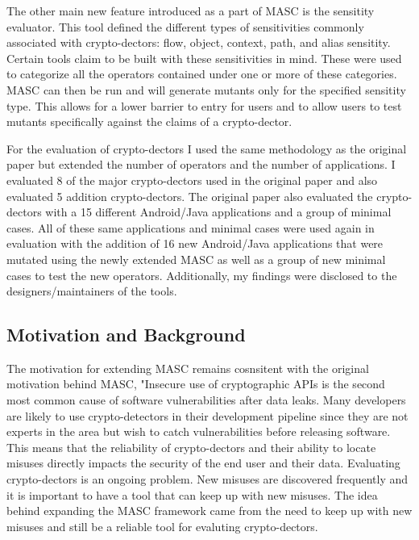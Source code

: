 The other main new feature introduced as a part of MASC is the sensitity evaluator. This tool defined the different types of sensitivities commonly associated with crypto-dectors: flow, object, context, path, and alias sensitity. Certain tools claim to be built with these sensitivities in mind. These were used to categorize all the operators contained under one or more of these categories. MASC can then be run and will generate mutants only for the specified sensitity type. This allows for a lower barrier to entry for users and to allow users to test mutants specifically against the claims of a crypto-dector. 

For the evaluation of crypto-dectors I used the same methodology as the original paper but extended the number of operators and the number of applications. I evaluated 8 of the major crypto-dectors used in the original paper and also evaluated 5 addition crypto-dectors. The original paper also evaluated the crypto-dectors with a 15 different Android/Java applications and a group of minimal cases. All of these same applications and minimal cases were used again in evaluation with the addition of 16 new Android/Java applications that were mutated using the newly extended MASC as well as a group of new minimal cases to test the new operators. Additionally, my findings were disclosed to the designers/maintainers of the tools. 


\subsection{Motivation and Background}
\label{ch1:subsec:motivation}

The motivation for extending MASC remains cosnsitent with the original motivation behind MASC, "Insecure use of cryptographic APIs is the second most common cause of software vulnerabilities after data leaks. Many developers are likely to use crypto-detectors in their development pipeline since they are not experts in the area but wish to catch vulnerabilities before releasing software. This means that the reliability of crypto-dectors and their ability to locate misuses directly impacts the security of the end user and their data. Evaluating crypto-dectors is an ongoing problem. New misuses are discovered frequently and it is important to have a tool that can keep up with new misuses. The idea behind expanding the MASC framework came from the need to keep up with new misuses and still be a reliable tool for evaluting crypto-dectors. 

